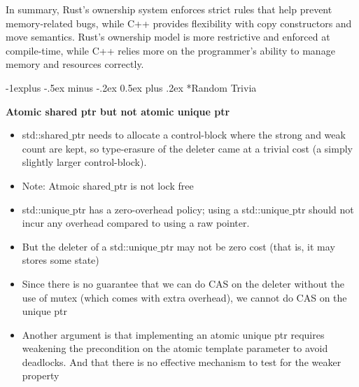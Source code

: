\documentclass[10pt, landscape]{article}
\makeatletter
\renewcommand{\subsection}{\@startsection{subsection}{2}{0mm}%
                                {-1explus -.5ex minus -.2ex}%
                                {0.5ex plus .2ex}%
                                {\normalfont\normalsize\bfseries}}
\makeatother
\begin{document}
\begin{multicols}{4}
In summary, Rust's ownership system enforces strict rules that help prevent memory-related bugs, while C++ provides flexibility with copy constructors and move semantics. Rust's ownership model is more restrictive and enforced at compile-time, while C++ relies more on the programmer's ability to manage memory and resources correctly.

\subsection*{Random Trivia}

\textbf{Atomic shared ptr but not atomic unique ptr} \\
\begin{itemize}
    \item std::shared$\_$ptr needs to allocate a control-block where the strong and weak count are kept, so type-erasure of the deleter came at a trivial cost (a simply slightly larger control-block).
    \item Note: Atmoic shared$\_$ptr is not lock free
    \item std::unique$\_$ptr has a zero-overhead policy; using a std::unique$\_$ptr should not incur any overhead compared to using a raw pointer.
    \item But the deleter of a std::unique$\_$ptr may not be zero cost (that is, it may stores some state)
    \item Since there is no guarantee that we can do CAS on the deleter without the use of mutex (which comes with extra overhead), we cannot do CAS on the unique ptr
    \item Another argument is that implementing an atomic unique ptr requires weakening the precondition on the atomic template parameter to avoid deadlocks. And that there is no effective mechanism to test for the weaker property
\end{itemize}

\end{multicols}
\end{document}

